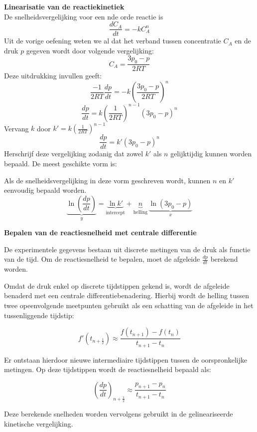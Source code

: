 \documentclass{ximera}
\begin{document}
\begin{question} \textbf{Linearisatie van de reactiekinetiek}
\\
De snelheidsvergelijking voor een nde orde reactie is 
\[
\frac{dC_A}{dt} = -kC_A ^n
\]
Uit de vorige oefening weten we al dat het verband tussen concentratie $C_A$ en de druk $p$ gegeven wordt door volgende vergelijking:
    \[
    C_A = \frac{3p_0-p}{2RT}
    \]
Deze uitdrukking invullen geeft: 
\[
\frac{-1}{2RT}\frac{dp}{dt} = -k(\frac{3p_0-p}{2RT})^n
\]
\[
\frac{dp}{dt} = k(\frac{1}{2RT})^{n-1}(3p_0-p)^n
\]
Vervang $k$ door $k' = k(\frac{1}{2RT})^{n-1}$
\[
\frac{dp}{dt} = k'(3p_0-p)^n
\]
Herschrijf deze vergelijking zodanig dat zowel $k'$ als $n$ gelijktijdig kunnen worden bepaald. De meest geschikte vorm is:

    \begin{multipleChoice}
    \end{multipleChoice}
    \begin{feedback} \text{  }
    
        Als de snelheidsvergelijking in deze vorm geschreven wordt, kunnen $n$ en $k'$ eenvoudig bepaald worden.
        \[
        \underbrace{\ln \left(\frac{dp}{dt}\right)}_{y}
        =
        \underbrace{\ln k'}_{\text{intercept}}
        +
        \underbrace{n}_{\text{helling}}
        \,
        \underbrace{\ln(3p_0 - p)}_{x}
        \]
    \end{feedback}

\end{question}

\begin{remark} \textbf{Bepalen van de reactiesnelheid met centrale differentie}

De experimentele gegevens bestaan uit discrete metingen van de druk als
functie van de tijd. Om de reactiesnelheid te bepalen, moet de afgeleide
$\frac{dp}{dt}$ berekend worden.

Omdat de druk enkel op discrete tijdstippen gekend is, wordt de afgeleide
benaderd met een centrale differentiebenadering. Hierbij wordt de helling
tussen twee opeenvolgende meetpunten gebruikt als een schatting van de
afgeleide in het tussenliggende tijdstip:

\[
f'\left(t_{n+\frac{1}{2}}\right)
\approx
\frac{f(t_{n+1})-f(t_n)}
{t_{n+1}-t_n}
\]

Er ontstaan hierdoor nieuwe intermediaire tijdstippen tussen de oorspronkelijke metingen. Op deze tijdstippen wordt de reactiesnelheid bepaald als:

\[
\left(\frac{dp}{dt}\right)_{n+\frac{1}{2}}
\approx
\frac{p_{n+1}-p_n}{t_{n+1}-t_n}
\]

Deze berekende snelheden worden vervolgens gebruikt in de gelineariseerde kinetische vergelijking.
\end{remark}
\end{document}
